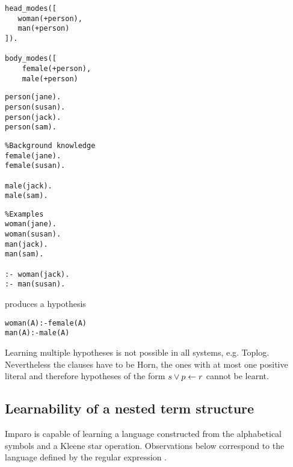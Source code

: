 \begin{minipage}[t]{.25\textwidth}
\begin{lstlisting}
head_modes([
   woman(+person),
   man(+person)
]).

body_modes([
    female(+person),
    male(+person)
\end{lstlisting}
\end{minipage}
\begin{minipage}[t]{.20\textwidth}
\begin{lstlisting}
person(jane).
person(susan).
person(jack).
person(sam).\end{lstlisting}
\end{minipage}
\begin{minipage}[t]{.30\textwidth}
\begin{lstlisting}
%Background knowledge
female(jane).
female(susan).

male(jack).
male(sam).
\end{lstlisting}
\end{minipage}
\begin{minipage}[t]{.25\textwidth}
\begin{lstlisting}
%Examples
woman(jane).
woman(susan).
man(jack).
man(sam).

:- woman(jack).
:- man(susan).
\end{lstlisting}
\end{minipage}


produces a hypothesis
\begin{lstlisting}
woman(A):-female(A)
man(A):-male(A)
\end{lstlisting}

Learning multiple hypotheses is not possible in all systems, e.g. Toplog. Nevertheless the clauses have to be Horn, the ones with at most one positive literal and therefore hypotheses of the form $s \vee p \leftarrow r$ cannot be learnt.

\subsection{Learnability of a nested term structure}
Imparo is capable of learning a language constructed from the alphabetical symbols and a Kleene star operation. Observations below correspond to the language defined by the regular expression .

